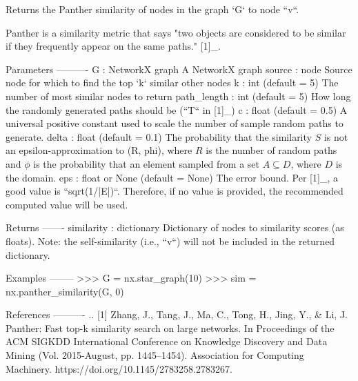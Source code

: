 \begin{DoxyVerb}Returns the Panther similarity of nodes in the graph `G` to node ``v``.

Panther is a similarity metric that says "two objects are considered
to be similar if they frequently appear on the same paths." [1]_.

Parameters
----------
G : NetworkX graph
    A NetworkX graph
source : node
    Source node for which to find the top `k` similar other nodes
k : int (default = 5)
    The number of most similar nodes to return
path_length : int (default = 5)
    How long the randomly generated paths should be (``T`` in [1]_)
c : float (default = 0.5)
    A universal positive constant used to scale the number
    of sample random paths to generate.
delta : float (default = 0.1)
    The probability that the similarity $S$ is not an epsilon-approximation to (R, phi),
    where $R$ is the number of random paths and $\phi$ is the probability
    that an element sampled from a set $A \subseteq D$, where $D$ is the domain.
eps : float or None (default = None)
    The error bound. Per [1]_, a good value is ``sqrt(1/|E|)``. Therefore,
    if no value is provided, the recommended computed value will be used.

Returns
-------
similarity : dictionary
    Dictionary of nodes to similarity scores (as floats). Note:
    the self-similarity (i.e., ``v``) will not be included in
    the returned dictionary.

Examples
--------
>>> G = nx.star_graph(10)
>>> sim = nx.panther_similarity(G, 0)

References
----------
.. [1] Zhang, J., Tang, J., Ma, C., Tong, H., Jing, Y., & Li, J.
       Panther: Fast top-k similarity search on large networks.
       In Proceedings of the ACM SIGKDD International Conference
       on Knowledge Discovery and Data Mining (Vol. 2015-August, pp. 1445–1454).
       Association for Computing Machinery. https://doi.org/10.1145/2783258.2783267.
\end{DoxyVerb}
 \mbox{\label{namespacenetworkx_1_1algorithms_1_1similarity_a3ab3e57878c9ac3f9b4bb761079276e1}} 
